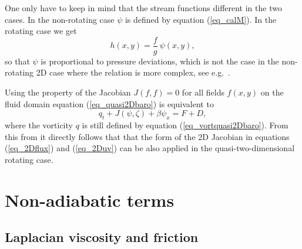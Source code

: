 One only have to keep in mind that the stream functions different in 
the two cases. In the non-rotating case $\psi$ is defined by 
equation (\ref{eq_calM}). In the rotating case we get 
\begin{equation} \label{eq_hquasi2Dbaropsi}
  h(x,y) = \frac{f}{g} \ \psi(x,y),    
\end{equation} 
so that $\psi$ is proportional to pressure deviations, which is not 
the case in the non-rotating 2D case where the relation is more
complex, see e.g.\ \cite{johnstonandliu2004}.

Using the property of the Jacobian $J(f,f) = 0$ for all fields
$f(x,y)$ on the fluid domain equation (\ref{eq_quasi2Dbaro})
is equivalent to
\begin{equation} \label{eq_quasi2Dbarozeta}
  q_{t} + J(\psi,\zeta) + \beta \psi_{x} = F + D,
\end{equation}
where the vorticity $q$ is still defined by equation 
(\ref{eq_vortquasi2Dbaro}). From this from it directly follows that
that the form of the 2D Jacobian in equations 
(\ref{eq_2Dflux}) and (\ref{eq_2Duv}) can be also applied in the 
quasi-two-dimensional rotating case.

\section{Non-adiabatic terms}

\subsection{Laplacian viscosity and friction}

